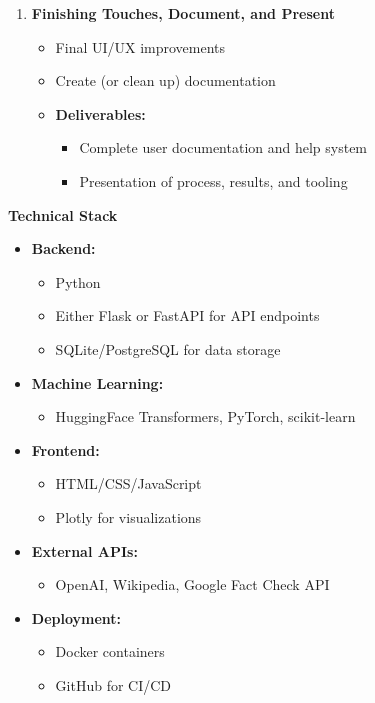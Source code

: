 \documentclass[11pt,letterpaper]{article}
\begin{document}
{\begin{enumerate}[label=\textbf{Week \arabic*:}]
    \item \textbf{Finishing Touches, Document, and Present}
    \begin{itemize}[label=$\bullet$]
        \item Final UI/UX improvements
        \item Create (or clean up) documentation
        \item \textbf{Deliverables:}
        \begin{itemize}[label=$\square$]
            \item Complete user documentation and help system
            \item Presentation of process, results, and tooling
        \end{itemize} 
    \end{itemize} 

\end{enumerate}

\vspace{1em}
\textbf{\large Technical Stack}

\begin{itemize}
    \item \textbf{Backend:}
    \begin{itemize}
        \item Python
        \item Either Flask or FastAPI for API endpoints
        \item SQLite/PostgreSQL for data storage
    \end{itemize}
    \item \textbf{Machine Learning:}
    \begin{itemize}
        \item HuggingFace Transformers, PyTorch, scikit-learn
    \end{itemize}
    \item \textbf{Frontend:}
    \begin{itemize}
        \item HTML/CSS/JavaScript
        \item Plotly for visualizations
    \end{itemize}
    \item \textbf{External APIs:}
    \begin{itemize}
        \item OpenAI, Wikipedia, Google Fact Check API
    \end{itemize}
    \item \textbf{Deployment:}
    \begin{itemize}
        \item Docker containers
        \item GitHub for CI/CD
    \end{itemize}
\end{itemize}
}
\end{document}
